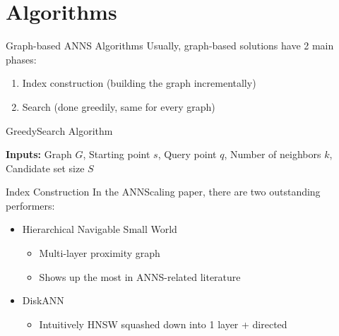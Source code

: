 \section{Algorithms}

\begin{frame}{Graph-based ANNS Algorithms}
    Usually, graph-based solutions have 2 main phases:
    \begin{enumerate}
        \item Index construction (building the graph incrementally)
        \item Search (done greedily, same for every graph)
    \end{enumerate}
\end{frame}

\begin{frame}
\begin{algorithm}[H]
    \caption{GreedySearch Algorithm}\label{alg:greedy-search}
    \begin{algorithmic}[1]
             
                \EndIf
            \EndWhile
        \EndFunction
    \end{algorithmic}
\end{algorithm}

\textbf{Inputs:} Graph \(G\), Starting point \(s\), Query point \(q\), Number of neighbors \(k\), Candidate set size \(S\)
\end{frame}

\begin{frame}{Index Construction}
    In the ANNScaling paper, there are two outstanding performers:
    \begin{itemize}
        \item Hierarchical Navigable Small World
            \begin{itemize}
                \item Multi-layer proximity graph
                \item Shows up the most in ANNS-related literature
            \end{itemize}
        \item DiskANN
            \begin{itemize}
                \item Intuitively HNSW squashed down into 1 layer + directed
            \end{itemize}
    \end{itemize}
\end{frame}

